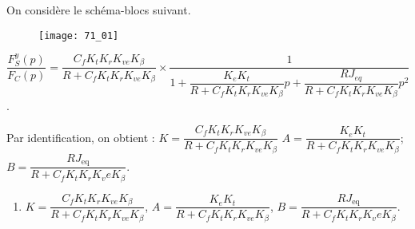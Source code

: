 \normalfalse \difficiletrue \tdifficilefalse
\correctiontrue


\setcounter{question}{0}%
\ifcorrection
\else
{}
\fi

\ifprof
\else

On considère le schéma-blocs suivant.
\begin{figure}[!h]
\texttt{[image: 71\_01]}
\end{figure}
\fi
{}
\ifprof
\begin{corrige}

$\dfrac{F_S^y (p)}{F_C (p)}=\dfrac{C_f K_t K_r K_{ve} K_{\beta}}{R+C_f K_t K_r K_{ve} K_{\beta} } \times \dfrac{1}{1+\dfrac{K_e K_t}{R+C_f K_t K_r K_{ve} K_{\beta} }p+\dfrac{RJ_{eq}}{R+C_f K_t K_r K_{ve} K_{\beta} } p^2}$.


Par identification, on obtient :
$K=\dfrac{C_f K_t K_r K_{ve} K_{\beta}}{R+C_f K_t K_r K_{ve} K_{\beta}}$
$A=\dfrac{K_e K_t}{R+C_f K_t K_r K_{ve} K_{\beta} }$;
$B=\dfrac{RJ_{\text{eq}}}{R+C_f K_t K_r K_ve K_{\beta} }$.

\end{corrige}
\else
\fi

 
 \ifprof
\else
\ifcolle
\else
\footnotesize
\begin{solution}
\begin{enumerate}
\item $K=\dfrac{C_f K_t K_r K_{ve} K_{\beta}}{R+C_f K_t K_r K_{ve} K_{\beta}}$,
$A=\dfrac{K_e K_t}{R+C_f K_t K_r K_{ve} K_{\beta} }$,
$B=\dfrac{RJ_{\text{eq}}}{R+C_f K_t K_r K_ve K_{\beta} }$.
\end{enumerate} 
\end{solution}
\fi

\fi


\ifprof
\else


\fi